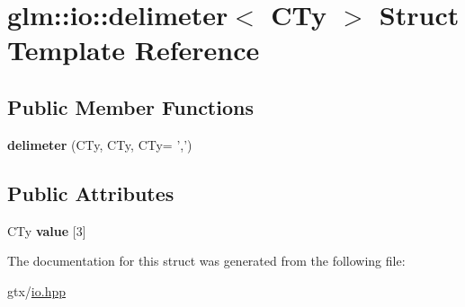 \hypertarget{structglm_1_1io_1_1delimeter}{\section{glm\-:\-:io\-:\-:delimeter$<$ C\-Ty $>$ Struct Template Reference}
\label{structglm_1_1io_1_1delimeter}
}
\subsection*{Public Member Functions}
\begin{DoxyCompactItemize}
\item 
\hypertarget{structglm_1_1io_1_1delimeter_aeca22f822a1a2613aa4996bd129f5c10}{{\bfseries delimeter} (C\-Ty, C\-Ty, C\-Ty= ',')}\label{structglm_1_1io_1_1delimeter_aeca22f822a1a2613aa4996bd129f5c10}

\end{DoxyCompactItemize}
\subsection*{Public Attributes}
\begin{DoxyCompactItemize}
\item 
\hypertarget{structglm_1_1io_1_1delimeter_a9ade129dae50c4f716f724e7425f9c68}{C\-Ty {\bfseries value} \mbox{[}3\mbox{]}}\label{structglm_1_1io_1_1delimeter_a9ade129dae50c4f716f724e7425f9c68}

\end{DoxyCompactItemize}


The documentation for this struct was generated from the following file\-:\begin{DoxyCompactItemize}
\item 
gtx/\hyperlink{io_8hpp}{io.\-hpp}\end{DoxyCompactItemize}

